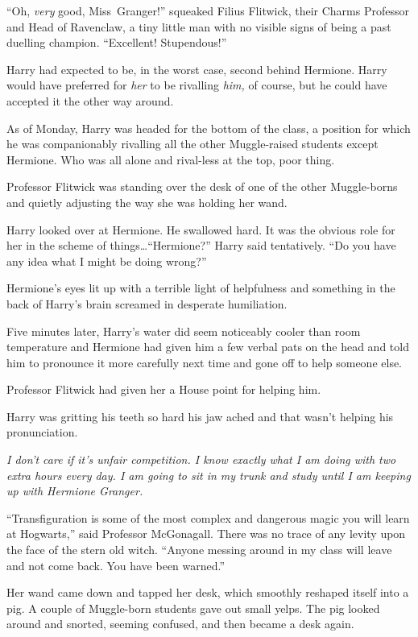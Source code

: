 “Oh, \emph{very} good, Miss~Granger!” squeaked Filius Flitwick, their Charms Professor and Head of Ravenclaw, a tiny little man with no visible signs of being a past duelling champion. “Excellent! Stupendous!”

Harry had expected to be, in the worst case, second behind Hermione. Harry would have preferred for \emph{her} to be rivalling \emph{him,} of course, but he could have accepted it the other way around.

As of Monday, Harry was headed for the bottom of the class, a position for which he was companionably rivalling all the other Muggle-raised students except Hermione. Who was all alone and rival-less at the top, poor thing.

Professor Flitwick was standing over the desk of one of the other Muggle-borns and quietly adjusting the way she was holding her wand.

Harry looked over at Hermione. He swallowed hard. It was the obvious role for her in the scheme of things…“Hermione?” Harry said tentatively. “Do you have any idea what I might be doing wrong?”

Hermione’s eyes lit up with a terrible light of helpfulness and something in the back of Harry’s brain screamed in desperate humiliation.

Five minutes later, Harry’s water did seem noticeably cooler than room temperature and Hermione had given him a few verbal pats on the head and told him to pronounce it more carefully next time and gone off to help someone else.

Professor Flitwick had given her a House point for helping him.

Harry was gritting his teeth so hard his jaw ached and that wasn’t helping his pronunciation.

\emph{I don’t care if it’s unfair competition. I know exactly what I am doing with two extra hours every day. I am going to sit in my trunk and study until I am keeping up with Hermione Granger.}

\later

“Transfiguration is some of the most complex and dangerous magic you will learn at Hogwarts,” said Professor McGonagall. There was no trace of any levity upon the face of the stern old witch. “Anyone messing around in my class will leave and not come back. You have been warned.”

Her wand came down and tapped her desk, which smoothly reshaped itself into a pig. A couple of Muggle-born students gave out small yelps. The pig looked around and snorted, seeming confused, and then became a desk again.


